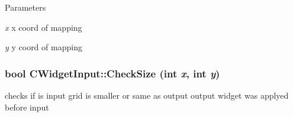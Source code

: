 \begin{DoxyParams}{Parameters}
\item[{\em x}]x coord of mapping \item[{\em y}]y coord of mapping \end{DoxyParams}
\hypertarget{classCWidgetInput_a0fd93c8aac117143c1365f9409a52dbd}{
\subsubsection[{CheckSize}]{\setlength{\rightskip}{0pt plus 5cm}bool CWidgetInput::CheckSize (int {\em x}, \/  int {\em y})}}
\label{classCWidgetInput_a0fd93c8aac117143c1365f9409a52dbd}
checks if is input grid is smaller or same as output output widget was applyed before input


